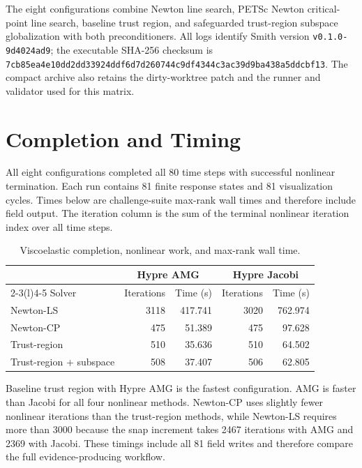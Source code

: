 \documentclass[11pt]{article}
\begin{document}
The eight configurations combine Newton line search, PETSc Newton critical-point
line search, baseline trust region, and safeguarded trust-region subspace
globalization with both preconditioners.  All logs identify Smith version
\texttt{v0.1.0-9d4024ad9}; the executable SHA-256 checksum is
\texttt{7cb85ea4e10dd2dd33924ddf6d7d260744c9df4344c3ac39d9ba438a5ddcbf13}.
The compact archive also retains the dirty-worktree patch and the runner and
validator used for this matrix.

\section*{Completion and Timing}

All eight configurations completed all 80 time steps with successful nonlinear
termination.  Each run contains 81 finite response states and 81 visualization
cycles.  Times below are challenge-suite max-rank
wall times and therefore include field output.  The iteration column is the sum
of the terminal nonlinear iteration index over all time steps.

\begin{table}[h]
  \centering
  \small
  \caption{Viscoelastic completion, nonlinear work, and max-rank wall time.}
  \begin{tabular}{@{}lrrrr@{}}
    \toprule
    & \multicolumn{2}{c}{Hypre AMG} & \multicolumn{2}{c}{Hypre Jacobi} \\
    \cmidrule(lr){2-3}\cmidrule(l){4-5}
    Solver & Iterations & Time (s) & Iterations & Time (s) \\
    \midrule
    Newton-LS & 3118 & 417.741 & 3020 & 762.974 \\
    Newton-CP & 475 & 51.389 & 475 & 97.628 \\
    Trust-region & 510 & 35.636 & 510 & 64.502 \\
    Trust-region + subspace & 508 & 37.407 & 506 & 62.805 \\
    \bottomrule
  \end{tabular}
\end{table}

Baseline trust region with Hypre AMG is the fastest configuration.  AMG is
faster than Jacobi for all four nonlinear methods. Newton-CP uses slightly fewer
nonlinear iterations than the trust-region methods, while Newton-LS requires
more than 3000 because the snap increment takes 2467 iterations with AMG and
2369 with Jacobi. These timings include all 81 field writes and therefore
compare the full evidence-producing workflow.
\end{document}
